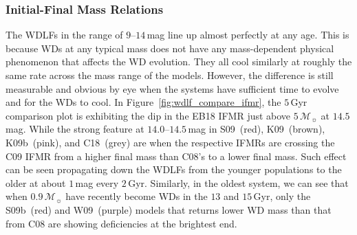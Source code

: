 \documentclass[fleqn,usenatbib]{rasti}
\newcommand{\msun}{\mathcal{M}_{\sun}}
\begin{document}
\subsubsection{Initial-Final Mass Relations}
The WDLFs in the range of $9$--$14$\,mag line up almost perfectly at any age.
This is because WDs at any typical mass does not have any mass-dependent
physical phenomenon that affects the WD evolution. They all cool similarly at
roughly the same rate across the mass range of the models. However, the
difference is still measurable and obvious by eye when the systems have
sufficient time to evolve and for the WDs to cool. In 
Figure~\ref{fig:wdlf_compare_ifmr}, the $5$\,Gyr comparison plot is exhibiting
the dip in the EB18 IFMR just above $5\,\msun$ at $14.5$\,mag. While the strong
feature at $14.0$--$14.5$\,mag in S09~(red), K09~(brown), K09b~(pink), and
C18~(grey) are when the respective IFMRs are crossing the C09 IFMR from a higher
final mass than C08's to a lower final mass. Such effect can be seen propagating
down the WDLFs from the younger populations to the older at about $1$\,mag every
$2$\,Gyr. Similarly, in the oldest system, we can see that when $0.9\,\msun$
have recently become WDs in the $13$ and $15$\,Gyr, only the S09b~(red) and
W09~(purple) models that returns lower WD mass than that from C08 are showing
deficiencies at the brightest end. 
\end{document}
